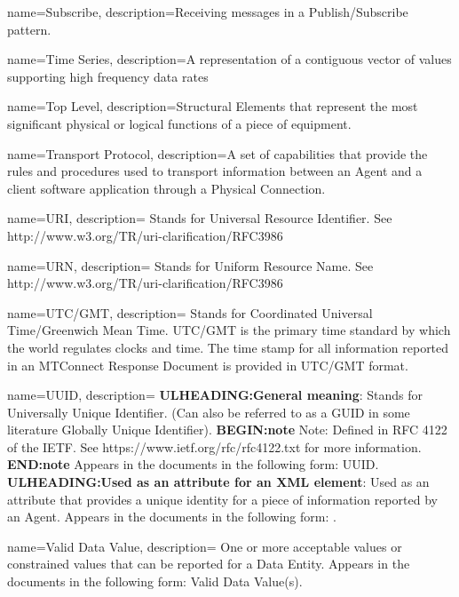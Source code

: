 {
    name={Subscribe},
	description={Receiving messages in a \gls{Publish/Subscribe} pattern.}
}

{
    name={Time Series},
	description={A  representation of a contiguous vector of values supporting high frequency data rates}
}

{
    name={Top Level},
	description={\glspl{Structural Element} that represent the most significant physical or logical functions of a piece of equipment.}
}

{
    name={Transport Protocol},
	description={A set of capabilities that provide the rules and procedures used to transport information between an \gls{Agent} and a client software application through a \gls{Physical Connection}.}
}

{
    name={URI},
	description={
	Stands for Universal Resource Identifier.  
	See http://www.w3.org/TR/uri-clarification/RFC3986  
}
}

{
    name={URN},
	description={
	Stands for Uniform Resource Name.  
	See http://www.w3.org/TR/uri-clarification/RFC3986  
}
}

{
    name={UTC/GMT},
	description={
	Stands for Coordinated Universal Time/Greenwich Mean Time.  
	UTC/GMT is the primary time standard by which the world regulates clocks and time.
	The time stamp for all information reported in an \gls{MTConnect Response Document} is provided in UTC/GMT format.
}
}

{
    name={UUID},
	description={
	\textbf{ULHEADING:General meaning}:
	Stands for Universally Unique Identifier. (Can also be referred to as a GUID in some literature  Globally Unique Identifier).
	\textbf{BEGIN:note}
	Note:  Defined in RFC 4122 of the IETF.  See https://www.ietf.org/rfc/rfc4122.txt for more information.
	\textbf{END:note}
	Appears in the documents in the following form: UUID.
	\textbf{ULHEADING:Used as an attribute for an XML element}:
	Used as an attribute that provides a unique identity for a piece of information reported by an \gls{Agent}.
	Appears in the documents in the following form: .
}
}

{
    name={Valid Data Value},
	description={
	One or more acceptable values or constrained values that can be reported for a \gls{Data Entity}.
	Appears in the documents in the following form: \gls{Valid Data Value}(s).
}
}

